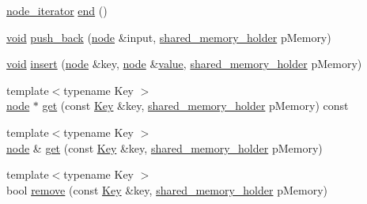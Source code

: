 \begin{DoxyCompactItemize}
\item 
\mbox{\hyperlink{namespace_y_a_m_l_1_1detail_aa2a961156810d41a3b6744c10186afac}{node\+\_\+iterator}} \mbox{\hyperlink{class_y_a_m_l_1_1detail_1_1node_a4199ba4fc7950191565b74d67a812f5a}{end}} ()
\item 
\mbox{\hyperlink{glad_8h_a950fc91edb4504f62f1c577bf4727c29}{void}} \mbox{\hyperlink{class_y_a_m_l_1_1detail_1_1node_a90d0509a511b4e18c5b48ad162ac4a34}{push\+\_\+back}} (\mbox{\hyperlink{class_y_a_m_l_1_1detail_1_1node}{node}} \&input, \mbox{\hyperlink{namespace_y_a_m_l_1_1detail_a228c4b3b6ba1058b474d40afc218e21d}{shared\+\_\+memory\+\_\+holder}} p\+Memory)
\item 
\mbox{\hyperlink{glad_8h_a950fc91edb4504f62f1c577bf4727c29}{void}} \mbox{\hyperlink{class_y_a_m_l_1_1detail_1_1node_aa8445f807834ea2f58bd9d241f59f489}{insert}} (\mbox{\hyperlink{class_y_a_m_l_1_1detail_1_1node}{node}} \&key, \mbox{\hyperlink{class_y_a_m_l_1_1detail_1_1node}{node}} \&\mbox{\hyperlink{glad_8h_a03aff08f73d7fde3d1a08e0abd8e84fa}{value}}, \mbox{\hyperlink{namespace_y_a_m_l_1_1detail_a228c4b3b6ba1058b474d40afc218e21d}{shared\+\_\+memory\+\_\+holder}} p\+Memory)
\item 
{\footnotesize template$<$typename Key $>$ }\\\mbox{\hyperlink{class_y_a_m_l_1_1detail_1_1node}{node}} $\ast$ \mbox{\hyperlink{class_y_a_m_l_1_1detail_1_1node_a116a2f6dc7961f34fe6c363ebea91760}{get}} (const \mbox{\hyperlink{namespace_y_a_m_l_a67c320aa50d3de7ecba1d0b8775dd684a1af533fc24b0311b8c4d5ac2870283aa}{Key}} \&key, \mbox{\hyperlink{namespace_y_a_m_l_1_1detail_a228c4b3b6ba1058b474d40afc218e21d}{shared\+\_\+memory\+\_\+holder}} p\+Memory) const
\item 
{\footnotesize template$<$typename Key $>$ }\\\mbox{\hyperlink{class_y_a_m_l_1_1detail_1_1node}{node}} \& \mbox{\hyperlink{class_y_a_m_l_1_1detail_1_1node_ab920aa2924623ffd11d82f6e1085556c}{get}} (const \mbox{\hyperlink{namespace_y_a_m_l_a67c320aa50d3de7ecba1d0b8775dd684a1af533fc24b0311b8c4d5ac2870283aa}{Key}} \&key, \mbox{\hyperlink{namespace_y_a_m_l_1_1detail_a228c4b3b6ba1058b474d40afc218e21d}{shared\+\_\+memory\+\_\+holder}} p\+Memory)
\item 
{\footnotesize template$<$typename Key $>$ }\\bool \mbox{\hyperlink{class_y_a_m_l_1_1detail_1_1node_a0ee08e5fa4438b6236e08e031f1fde5e}{remove}} (const \mbox{\hyperlink{namespace_y_a_m_l_a67c320aa50d3de7ecba1d0b8775dd684a1af533fc24b0311b8c4d5ac2870283aa}{Key}} \&key, \mbox{\hyperlink{namespace_y_a_m_l_1_1detail_a228c4b3b6ba1058b474d40afc218e21d}{shared\+\_\+memory\+\_\+holder}} p\+Memory)

\end{DoxyCompactItemize}
